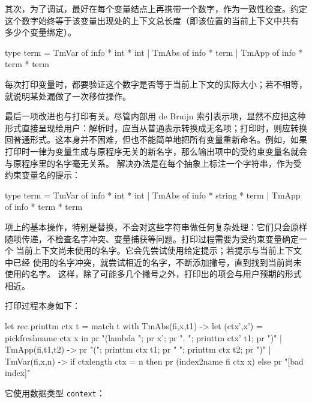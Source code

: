 其次，为了调试，最好在每个变量结点上再携带一个数字，作为一致性检查。约定
这个数字始终等于该变量出现处的上下文总长度（即该位置的当前上下文中共有
多少个变量绑定）。

\noindent\begin{minipage}{\linewidth}
\begin{taplocamlcode}
type term =
    TmVar of info * int * int
  | TmAbs of info * term
  | TmApp of info * term * term
\end{taplocamlcode}
\end{minipage}

每次打印变量时，都要验证这个数字是否等于当前上下文的实际大小；若不相等，
就说明某处漏做了一次移位操作。

最后一项改进也与打印有关。尽管内部用 de Bruijn 索引表示项，显然不应把这种
形式直接呈现给用户：解析时，应当从普通表示转换成无名项；打印时，则应转换
回普通形式。这本身并不困难，但也不能简单地把所有变量重新命名。例如，如果
打印时一律为变量生成与原程序无关的新名字，那么输出项中的受约束变量名就会
与原程序里的名字毫无关系。
解决办法是在每个抽象上标注一个字符串，作为受约束变量名的提示：

\begin{taplocamlcode}
type term =
    TmVar of info * int * int
  | TmAbs of info * string * term
  | TmApp of info * term * term
\end{taplocamlcode}

项上的基本操作，特别是替换，不会对这些字符串做任何复杂处理：它们只会原样
随项传递，不检查名字冲突、变量捕获等问题。打印过程需要为受约束变量确定一个
当前上下文尚未使用的名字。它会先尝试使用给定提示；若提示与当前上下文中已经
使用的名字冲突，就尝试相近的名字，不断添加撇号，直到找到当前尚未使用的名字。
这样，除了可能多几个撇号之外，打印出的项会与用户预期的形式相近。

打印过程本身如下：

\begin{taplocamlcode}
let rec printtm ctx t = match t with
    TmAbs(fi,x,t1) ->
      let (ctx',x') = pickfreshname ctx x in
      pr "(lambda "; pr x'; pr ". "; printtm ctx' t1; pr ")"
  | TmApp(fi,t1,t2) ->
      pr "("; printtm ctx t1; pr " "; printtm ctx t2; pr ")"
  | TmVar(fi,x,n) ->
      if ctxlength ctx = n then
        pr (index2name fi ctx x)
      else
        pr "[bad index]"
\end{taplocamlcode}

它使用数据类型 \texttt{context}：

